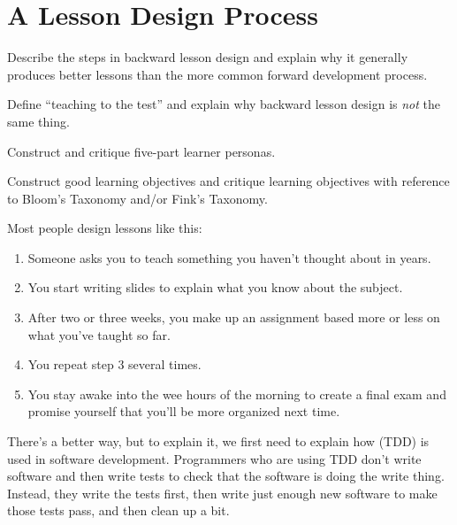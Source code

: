 \chapter{A Lesson Design Process}\label{s:process}

\begin{objectives}

\item
  Describe the steps in backward lesson design and explain why it
  generally produces better lessons than the more common forward
  development process.

\item
  Define ``teaching to the test'' and explain why backward lesson
  design is \emph{not} the same thing.

\item
  Construct and critique five-part learner personas.

\item
  Construct good learning objectives and critique learning objectives
  with reference to Bloom's Taxonomy and/or Fink's Taxonomy.

\end{objectives}

Most people design lessons like this:

\begin{enumerate}

\item
  Someone asks you to teach something you haven't thought about in
  years.

\item
  You start writing slides to explain what you know about the subject.

\item
  After two or three weeks, you make up an assignment based more or
  less on what you've taught so far.

\item
  You repeat step 3 several times.

\item
  You stay awake into the wee hours of the morning to create a final
  exam and promise yourself that you'll be more organized next time.

\end{enumerate}

There's a better way, but to explain it, we first need to explain how
 (TDD) is
used in software development. Programmers who are using TDD don't
write software and then write tests to check that the software is
doing the write thing. Instead, they write the tests first, then write
just enough new software to make those tests pass, and then clean up a
bit.

